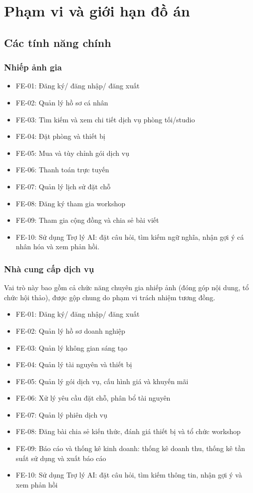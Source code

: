 \section{Phạm vi và giới hạn đồ án}

\subsection{Các tính năng chính}

\subsubsection{Nhiếp ảnh gia}
\begin{itemize}
	\item FE-01: Đăng ký/ đăng nhập/ đăng xuất
	\item FE-02: Quản lý hồ sơ cá nhân
	\item FE-03: Tìm kiếm và xem chi tiết dịch vụ phòng tối/studio 
	\item FE-04: Đặt phòng và thiết bị
	\item FE-05: Mua và tùy chỉnh gói dịch vụ
	\item FE-06: Thanh toán trực tuyến
	\item FE-07: Quản lý lịch sử đặt chỗ
	\item FE-08: Đăng ký tham gia workshop
	\item FE-09: Tham gia cộng đồng và chia sẻ bài viết
	\item FE-10: Sử dụng Trợ lý AI: đặt câu hỏi, tìm kiếm ngữ nghĩa, nhận gợi ý cá nhân hóa và xem phản hồi.
\end{itemize}

\subsubsection{Nhà cung cấp dịch vụ}
Vai trò này bao gồm cả chức năng chuyên gia nhiếp ảnh (đóng góp nội dung, tổ chức hội thảo), được gộp chung do phạm vi trách nhiệm tương đồng.
\begin{itemize}
	\item FE-01: Đăng ký/ đăng nhập/ đăng xuất
	\item FE-02: Quản lý hồ sơ doanh nghiệp
	\item FE-03: Quản lý không gian sáng tạo
	\item FE-04: Quản lý tài nguyên và thiết bị
	\item FE-05: Quản lý gói dịch vụ, cấu hình giá và khuyến mãi
	\item FE-06: Xử lý yêu cầu đặt chỗ, phân bổ tài nguyên
	\item FE-07: Quản lý phiên dịch vụ 
	\item FE-08: Đăng bài chia sẻ kiến thức, đánh giá thiết bị và tổ chức workshop 
	\item FE-09: Báo cáo và thống kê kinh doanh: thống kê doanh thu, thống kê tần suất sử dụng và xuất báo cáo
	\item FE-10: Sử dụng Trợ lý AI: đặt câu hỏi, tìm kiếm thông tin, nhận gợi ý và xem phản hồi
\end{itemize}

